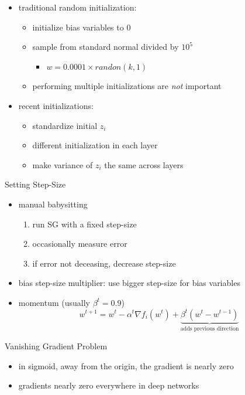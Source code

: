 \documentclass[10pt,landscape,a4paper]{article}
\begin{document}
\begin{multicols*}{5}
\begin{itemize}
\begin{itemize}
    \end{itemize}
    \item traditional random initialization:
    \begin{itemize}
        \item initialize bias variables to 0
        \item sample from standard normal divided by \(10^5\)
        \begin{itemize}
            \item \(w = 0.0001 \times randon(k, 1)\)
        \end{itemize}
        \item performing multiple initializations are \emph{not} important
    \end{itemize}
    \item recent initializations:
    \begin{itemize}
        \item standardize initial \(z_i\)
        \item different initialization in each layer
        \item make variance of \(z_i\) the same across layers
    \end{itemize}
\end{itemize}
Setting Step-Size
\begin{itemize}
    \item manual babysitting
    \begin{enumerate}
        \item run SG with a fixed step-size
        \item occasionally measure error
        \item if error not deceasing, decrease step-size
    \end{enumerate}
    \item bias step-size multiplier: use bigger step-size for bias variables
    \item momentum (usually \(\beta^t = 0.9\))
    \begin{dmath*}
        w^{t+1} = w^t - \alpha^t \nabla f_i(w^t) + \underbrace{\beta^t (w^t - w^{t-1})}_{\text{adds previous direction}}
    \end{dmath*}
\end{itemize}
Vanishing Gradient Problem
\begin{itemize}
    \item in sigmoid, away from the origin, the gradient is nearly zero
    \item gradients nearly zero everywhere in deep networks

\end{itemize}
\end{multicols*}
\end{document}
